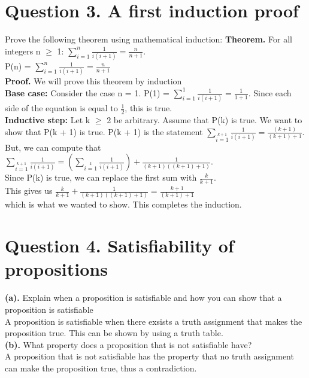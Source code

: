 \documentclass[a4paper]{article}
\begin{document}
\section{Question 3. A first induction proof}
Prove the following theorem using mathematical induction:
\textbf{Theorem.} For all integers n $\geq $ 1: $\sum^n_{i=1}{\frac{1}{i(i + 1)} = \frac{n}{n + 1}}$.\\
P(n) = $\sum^n_{i=1}{\frac{1}{i(i + 1)} = \frac{n}{n + 1}}$\\
\textbf{Proof.} We will prove this theorem by induction\\
\textbf{Base case:} Consider the case n = 1. P(1) = $\sum^1_{i=1}{\frac{1}{i(i + 1)} = \frac{1}{1 + 1}}$. Since each side of the equation is equal to $\frac{1}{2}$, this is true.\\
\textbf{Inductive step:} Let k $\geq$ 2 be arbitrary. Assume that P(k) is true. We want to show that P(k + 1) is true. P(k + 1) is the statement $\sum_{i=1}\limits^{k+1}{\frac{1}{i(i + 1)} = \frac{(k+1)}{(k+1) + 1}}$. But, we can compute that\\
$\sum_{i=1}\limits^{k+1}{\frac{1}{i(i + 1)} = (\sum_{i=1}\limits^{k}{\frac{1}{i(i + 1)}}) + \frac{1}{(k+1)((k+1) + 1)}}$.\\
Since P(k) is true, we can replace the first sum with $\frac{k}{k + 1}$.\\
This gives us $\frac{k}{k + 1} + \frac{1}{(k+1)((k+1) + 1)} = \frac{k + 1}{(k + 1) + 1}$\\
which is what we wanted to show. This completes the induction.\\

\newpage

\section{Question 4. Satisfiability of propositions}
\textbf{(a).} Explain when a proposition is satisfiable and how you can show that a proposition is satisfiable\\
A proposition is satisfiable when there exsists a truth assignment that makes the proposition true. This can be shown by using a truth table.\\

\textbf{(b).} What property does a proposition that is not satisfiable have?\\
A proposition that is not satisfiable has the property that no truth assignment can make the proposition true, thus a contradiction.\\
\end{document}

